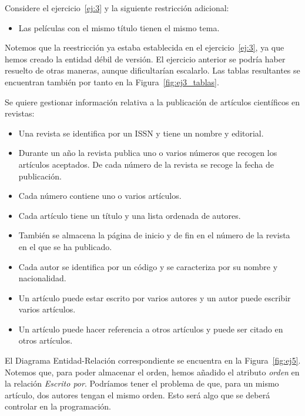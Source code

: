 \begin{ejercicio} \label{ej:4}
    Considere el ejercicio~\ref{ej:3} y la siguiente restricción adicional:
    \begin{itemize}
        \item Las películas con el mismo título tienen el mismo tema.
    \end{itemize}

    Notemos que la reestricción ya estaba establecida en el ejercicio~\ref{ej:3}, ya que hemos creado la entidad débil de versión.
    El ejercicio anterior se podría haber resuelto de otras maneras, aunque dificultarían escalarlo.
    Las tablas resultantes se encuentran también por tanto en la Figura~\ref{fig:ej3_tablas}.
\end{ejercicio}

\begin{ejercicio} \label{ej:5}
    Se quiere gestionar información relativa a la publicación de artículos científicos en revistas:
    \begin{itemize}
        \item Una revista se identifica por un ISSN y tiene un nombre y editorial.
        \item Durante un año la revista publica uno o varios números que recogen los artículos aceptados. De cada número de la revista se recoge la fecha de publicación.
        \item Cada número contiene uno o varios artículos.
        \item Cada artículo tiene un título y una lista ordenada de autores.
        \item También se almacena la página de inicio y de fin en el número de la revista en el que se ha publicado.
        \item Cada autor se identifica por un código y se caracteriza por su nombre y nacionalidad.
        \item Un artículo puede estar escrito por varios autores y un autor puede escribir varios artículos.
        \item Un artículo puede hacer referencia a otros artículos y puede ser citado en otros artículos.
    \end{itemize}

    El Diagrama Entidad-Relación correspondiente se encuentra en la Figura~\ref{fig:ej5}.
    Notemos que, para poder almacenar el orden, hemos añadido el atributo \emph{orden} en la relación \emph{Escrito por}.
    Podríamos tener el problema de que, para un mismo artículo, dos autores tengan el mismo orden. Esto será algo que se deberá controlar en la programación.
    \begin{figure}
        \centering
\end{figure}
\end{ejercicio}
